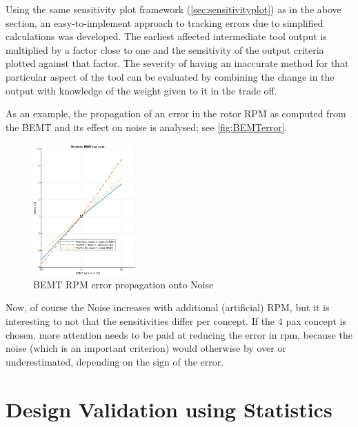 

Using the same sensitivity plot framework (\autoref{sec:sensitivityplot}) as in the above section, an easy-to-implement approach to tracking errors due to simplified calculations was developed. The earliest affected intermediate tool output is multiplied by a factor close to one and the sensitivity of the output criteria plotted against that factor. The severity of having an inaccurate method for that particular aspect of the tool can be evaluated by combining the change in the output with knowledge of the weight given to it in the trade off.

As an example, the propagation of an error in the rotor RPM as computed from the BEMT and its effect on noise is analysed; see \autoref{fig:BEMTerror}.

\begin{figure}
    \centering
    \includegraphics[width=0.35\textwidth]{Figures/NoiseBEMT.PNG}
    \captionsetup{justification=centering}
    \caption{BEMT RPM error propagation onto Noise}
    \label{fig:BEMTerror}
\end{figure}

Now, of course the Noise increases with additional (artificial) RPM, but it is interesting to not that the sensitivities differ per concept. If the 4 pax concept is chosen, more attention needs to be paid at reducing the error in rpm, because the noise (which is an important criterion) would otherwise by over or underestimated, depending on the sign of the error.




\section{Design Validation using Statistics} \label{sec:statsVal}

